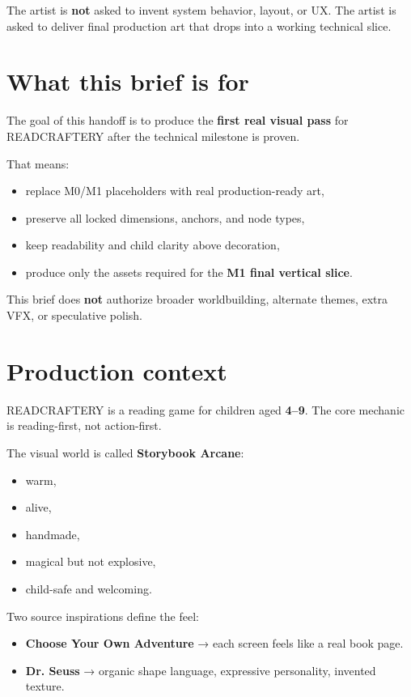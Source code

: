 \documentclass[11pt,a4paper]{article}
\begin{document}
The artist is \textbf{not} asked to invent system behavior, layout, or UX. The artist is asked to deliver final production art that drops into a working technical slice.

\section{What this brief is for}

The goal of this handoff is to produce the \textbf{first real visual pass} for READCRAFTERY after the technical milestone is proven.

That means:
\begin{itemize}
  \item replace M0/M1 placeholders with real production-ready art,
  \item preserve all locked dimensions, anchors, and node types,
  \item keep readability and child clarity above decoration,
  \item produce only the assets required for the \textbf{M1 final vertical slice}.
\end{itemize}

This brief does \textbf{not} authorize broader worldbuilding, alternate themes, extra VFX, or speculative polish.

\section{Production context}

READCRAFTERY is a reading game for children aged \textbf{4–9}. The core mechanic is reading-first, not action-first.

The visual world is called \textbf{Storybook Arcane}:
\begin{itemize}
  \item warm,
  \item alive,
  \item handmade,
  \item magical but not explosive,
  \item child-safe and welcoming.
\end{itemize}

Two source inspirations define the feel:
\begin{itemize}
  \item \textbf{Choose Your Own Adventure} → each screen feels like a real book page.
  \item \textbf{Dr. Seuss} → organic shape language, expressive personality, invented texture.
\end{itemize}
\end{document}
